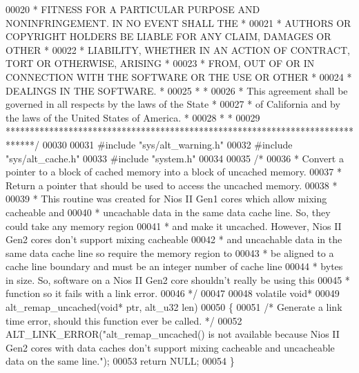 \begin{DoxyCode}
00020 \textcolor{comment}{* FITNESS FOR A PARTICULAR PURPOSE AND NONINFRINGEMENT. IN NO EVENT SHALL THE *}
00021 \textcolor{comment}{* AUTHORS OR COPYRIGHT HOLDERS BE LIABLE FOR ANY CLAIM, DAMAGES OR OTHER      *}
00022 \textcolor{comment}{* LIABILITY, WHETHER IN AN ACTION OF CONTRACT, TORT OR OTHERWISE, ARISING     *}
00023 \textcolor{comment}{* FROM, OUT OF OR IN CONNECTION WITH THE SOFTWARE OR THE USE OR OTHER         *}
00024 \textcolor{comment}{* DEALINGS IN THE SOFTWARE.                                                   *}
00025 \textcolor{comment}{*                                                                             *}
00026 \textcolor{comment}{* This agreement shall be governed in all respects by the laws of the State   *}
00027 \textcolor{comment}{* of California and by the laws of the United States of America.              *}
00028 \textcolor{comment}{*                                                                             *}
00029 \textcolor{comment}{******************************************************************************/}
00030 
00031 \textcolor{preprocessor}{#include "sys/alt_warning.h"}
00032 \textcolor{preprocessor}{#include "sys/alt_cache.h"}
00033 \textcolor{preprocessor}{#include "system.h"}
00034 
00035 \textcolor{comment}{/*}
00036 \textcolor{comment}{ * Convert a pointer to a block of cached memory into a block of uncached memory.}
00037 \textcolor{comment}{ * Return a pointer that should be used to access the uncached memory.}
00038 \textcolor{comment}{ *}
00039 \textcolor{comment}{ * This routine was created for Nios II Gen1 cores which allow mixing cacheable and}
00040 \textcolor{comment}{ * uncachable data in the same data cache line. So, they could take any memory region}
00041 \textcolor{comment}{ * and make it uncached. However, Nios II Gen2 cores don't support mixing cacheable}
00042 \textcolor{comment}{ * and uncachable data in the same data cache line so require the memory region to}
00043 \textcolor{comment}{ * be aligned to a cache line boundary and must be an integer number of cache line}
00044 \textcolor{comment}{ * bytes in size. So, software on a Nios II Gen2 core shouldn't really be using this}
00045 \textcolor{comment}{ * function so it fails with a link error.}
00046 \textcolor{comment}{ */}
00047 
00048 \textcolor{keyword}{volatile} \textcolor{keywordtype}{void}* 
00049 alt_remap_uncached(\textcolor{keywordtype}{void}* ptr, alt_u32 len)
00050 \{
00051   \textcolor{comment}{/* Generate a link time error, should this function ever be called. */}
00052   ALT_LINK_ERROR(\textcolor{stringliteral}{"alt\_remap\_uncached() is not available because Nios II Gen2 cores with data caches don't
       support mixing cacheable and uncacheable data on the same line."});
00053   \textcolor{keywordflow}{return} NULL;
00054 \}
\end{DoxyCode}
